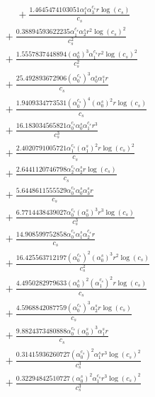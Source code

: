 \documentclass[10pt]{article}
\begin{document}
\begin{align*}
\phantom{R_{3,7}} &\phantom{={}}{}  + \frac{1.4645474103051 \alpha_{1}^s \alpha_{3}^{c_s} r \log{\left(c_{s} \right)}}{c_{s}} \\
&{}  + \frac{0.38894593622235 \alpha_{1}^{c_s} \alpha_{2}^s r^{2} \log{\left(c_{s} \right)}^{2}}{c_{s}^{2}} \\
&{}  + \frac{1.5557837448894 \left(\alpha_{0}^s\right)^{3} \alpha_{1}^{c_s} r^{2} \log{\left(c_{s} \right)}^{2}}{c_{s}^{2}} \\
&{}  + \frac{25.492893672906 \left(\alpha_{0}^{c_s}\right)^{3} \alpha_{0}^s \alpha_{1}^s r}{c_{s}} \\
&{}  + \frac{1.9409334773531 \left(\alpha_{0}^{c_s}\right)^{4} \left(\alpha_{0}^s\right)^{2} r \log{\left(c_{s} \right)}}{c_{s}} \\
&{}  + \frac{16.183034565821 \alpha_{0}^{c_s} \alpha_{0}^s \alpha_{1}^{c_s} r^{3}}{c_{s}^{3}} \\
&{}  + \frac{2.4020791005721 \alpha_{1}^{c_s} \left(\alpha_{1}^s\right)^{2} r \log{\left(c_{s} \right)}^{2}}{c_{s}} \\
&{}  + \frac{2.6441120746798 \alpha_{2}^{c_s} \alpha_{2}^s r \log{\left(c_{s} \right)}}{c_{s}} \\
&{}  + \frac{5.6448611555529 \alpha_{0}^{c_s} \alpha_{0}^s \alpha_{3}^s r}{c_{s}} \\
&{}  + \frac{6.7714438439027 \alpha_{0}^{c_s} \left(\alpha_{0}^s\right)^{3} r^{3} \log{\left(c_{s} \right)}}{c_{s}^{3}} \\
&{}  + \frac{14.908599752858 \alpha_{0}^{c_s} \alpha_{1}^s \alpha_{2}^{c_s} r}{c_{s}} \\
&{}  + \frac{16.425563712197 \left(\alpha_{0}^{c_s}\right)^{2} \left(\alpha_{0}^s\right)^{3} r^{2} \log{\left(c_{s} \right)}}{c_{s}^{2}} \\
&{}  + \frac{4.4950282979633 \left(\alpha_{0}^s\right)^{2} \left(\alpha_{1}^{c_s}\right)^{2} r \log{\left(c_{s} \right)}}{c_{s}} \\
&{}  + \frac{4.5968842087759 \left(\alpha_{0}^{c_s}\right)^{3} \alpha_{2}^s r \log{\left(c_{s} \right)}}{c_{s}} \\
&{}  + \frac{9.8824373480888 \alpha_{0}^{c_s} \left(\alpha_{0}^s\right)^{3} \alpha_{1}^s r}{c_{s}} \\
&{}  + \frac{0.31415936260727 \left(\alpha_{0}^{c_s}\right)^{2} \alpha_{1}^s r^{3} \log{\left(c_{s} \right)}^{2}}{c_{s}^{3}} \\
&{}  + \frac{0.32294842510727 \left(\alpha_{0}^s\right)^{2} \alpha_{1}^{c_s} r^{3} \log{\left(c_{s} \right)}^{2}}{c_{s}^{3}} \\

\end{align*}
\end{document}
